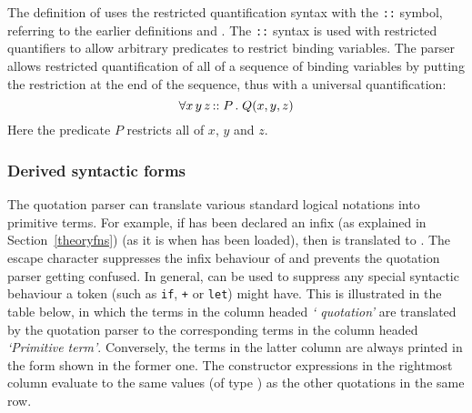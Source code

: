 The definition of  uses the restricted
quantification syntax with the {\small\verb+::+} symbol, referring to
the earlier definitions  and .
The \texttt{::} syntax is used with restricted quantifiers to allow
arbitrary predicates to restrict binding variables. The \HOL{} parser
allows restricted quantification of all of a sequence of binding
variables by putting the restriction at the end of the sequence, thus
with a universal quantification:
%
\[
\forall x \, y \, z \, {\tt ::} \; P \, . \; Q(x,y,z)
\]
%
Here the predicate $P$ restricts all of $x$, $y$ and $z$.

\subsubsection{Derived syntactic forms}\label{derived-terms}

The \HOL{} quotation parser
%
%
can translate various standard logical
notations
%
%
into primitive terms. For example, if \ml{+} has been declared an
infix
%
%
(as explained in Section~\ref{theoryfns}) (as it is when
 has been loaded), then  is
translated to . The escape character \ml{\$}
%
%
suppresses the infix behaviour of \ml{+} and prevents the quotation
parser getting confused.  In general, \ml{\$} can be used to suppress
any special syntactic behaviour a token (such as \texttt{if},
\texttt{+} or \texttt{let})
%
%
might have. This is illustrated in the table below, in which the terms
in the column headed \textit{`\ML{} quotation'} are translated by the
quotation parser to the corresponding terms in the column headed
\textit{`Primitive term'}.  Conversely, the terms in the latter column
are always printed in the form shown in the former one.  The \ML{}
constructor expressions in the rightmost column evaluate to the same
values (of type ) as the other quotations in the same row.

